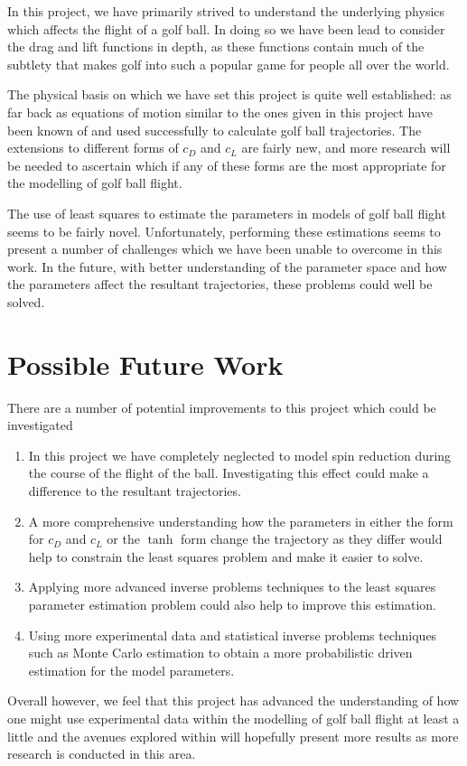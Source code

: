 In this project, we have primarily strived to understand the underlying physics which affects the flight
of a golf ball. In doing so we have been lead to consider the drag and lift functions in depth, as
these functions contain much of the subtlety that makes golf into such a popular game for people all
over the world.

The physical basis on which we have set this project is quite well established: as far back as
\citet{Bearman1976} equations of motion similar to the ones given in this project have been known of
and used successfully to calculate golf ball trajectories. The extensions to different forms of 
$c_D$ and $c_L$ are fairly new, and more research will be needed to ascertain which if any of these
forms are the most appropriate for the modelling of golf ball flight.

The use of least squares to estimate the parameters in models of golf ball flight seems to be fairly
novel. Unfortunately, performing these estimations seems to present a number of challenges which
we have been unable to overcome in this work. In the future, with better understanding of the parameter
space and how the parameters affect the resultant trajectories, these problems could well be solved.

\section{Possible Future Work}

There are a number of potential improvements to this project which could be investigated
\begin{enumerate}
\item In this project we have completely neglected to model spin reduction during the course
of the flight of the ball. Investigating this effect could make a difference to the resultant 
trajectories.
\item A more comprehensive understanding how the parameters in either the \citet{Lieberman2001} form 
for $c_D$ and $c_L$ or the $\tanh$ form change the trajectory as they differ would help to constrain
the least squares problem and make it easier to solve.
\item Applying more advanced inverse problems techniques to the least squares parameter estimation
problem could also help to improve this estimation.
\item Using more experimental data and statistical inverse problems techniques such as Monte Carlo 
estimation to obtain a more probabilistic driven estimation for the model parameters. 
\end{enumerate}

Overall however, we feel that this project has advanced the understanding of how one might use 
experimental data within the modelling of golf ball flight at least a little and the avenues explored
within will hopefully present more results as more research is conducted in this area.